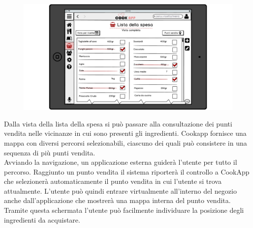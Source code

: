 \begin{figure}[H]
	\centering
	\includegraphics[width=0.95\linewidth]{img/mockup/spesa-completa.png}
\end{figure}

Dalla vista della lista della spesa si può passare alla consultazione
dei punti vendita nelle vicinanze in cui sono presenti gli ingredienti.
Cookapp fornisce una mappa con diversi percorsi selezionabili, ciascuno dei quali
può consistere in una sequenza di più punti vendita.\\ 
Avviando la
navigazione, un applicazione esterna guiderà l'utente per tutto il
percorso. Raggiunto un punto vendita il sistema riporterà il controllo a
CookApp che selezionerà automaticamente il punto vendita in cui l'utente
si trova attualmente. L'utente può quindi entrare virtualmente all'interno del
negozio anche dall'applicazione che mostrerà una mappa interna del punto
vendita. Tramite questa schermata l'utente può facilmente individuare
la posizione degli ingredienti da acquistare.

